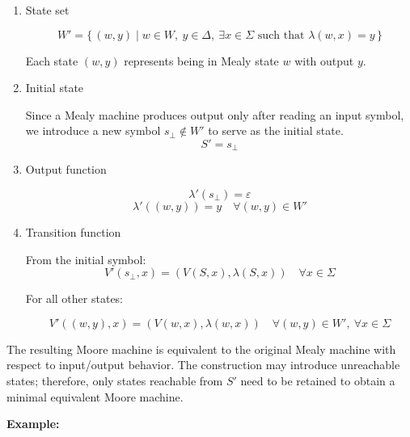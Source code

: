 \documentclass[12pt,a4paper,openany]{article}
\begin{document}
\begin{enumerate}
    \item State set

    \[
    W' = \{\, (w, y) \mid w \in W,\ y \in \Delta,\ \exists x \in \Sigma \text{ such that } \lambda(w,x) = y \,\}
    \]

    Each state \((w,y)\) represents being in Mealy state \(w\) with output \(y\).

    \item Initial state

    Since a Mealy machine produces output only after reading an input symbol,
    we introduce a new symbol \(s_\bot \notin W'\) to serve as the initial state.
    \[
    S' = s_\bot
    \]

    \item Output function

    \[
    \lambda'(s_\bot) = \varepsilon
    \]
    \[
    \lambda'((w,y)) = y \quad \forall (w,y) \in W'
    \]

    \item Transition function

    From the initial symbol:
    \[
    V'(s_\bot, x) = (V(S,x), \lambda(S,x)) \quad \forall x \in \Sigma
    \]

    For all other states:

    \[
    V'((w,y), x) = (V(w,x), \lambda(w,x)) \quad \forall (w,y) \in W',\ \forall x \in \Sigma
    \]
    
\end{enumerate}

The resulting Moore machine is equivalent to the original Mealy machine with
respect to input/output behavior. The construction may introduce unreachable
states; therefore, only states reachable from \(S'\) need to be retained to
obtain a minimal equivalent Moore machine.

\textbf{Example:}
\end{document}
